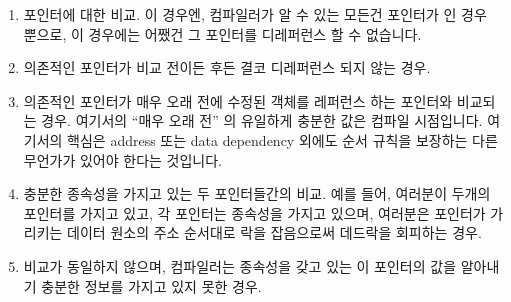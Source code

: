 \begin{enumerate}
\item	{} 포인터에 대한 비교.
	이 경우엔, 컴파일러가 알 수 있는 모든건 포인터가  인 경우
	뿐으로, 이 경우에는 어쨌건 그 포인터를 디레퍼런스 할 수 없습니다.
\item	의존적인 포인터가 비교 전이든 후든 결코 디레퍼런스 되지 않는 경우.
\item	의존적인 포인터가 매우 오래 전에 수정된 객체를 레퍼런스 하는 포인터와
	비교되는 경우.  여기서의 ``매우 오래 전'' 의 유일하게 충분한 값은
	컴파일 시점입니다.
	여기서의 핵심은 address 또는 data dependency 외에도 순서 규칙을
	보장하는 다른 무언가가 있어야 한다는 것입니다.

\item	충분한 종속성을 가지고 있는 두 포인터들간의 비교.
	예를 들어, 여러분이 두개의 포인터를 가지고 있고, 각 포인터는 종속성을
	가지고 있으며, 여러분은 포인터가 가리키는 데이터 원소의 주소 순서대로
	락을 잡음으로써 데드락을 회피하는 경우.
\item	비교가 동일하지 않으며, 컴파일러는 종속성을 갖고 있는 이 포인터의 값을
	알아내기 충분한 정보를 가지고 있지 못한 경우.

\end{enumerate}


